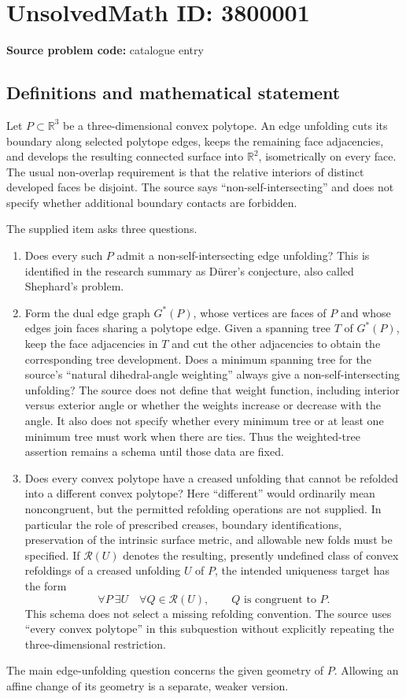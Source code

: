 \documentclass[11pt]{article}
\newcommand{\R}{\mathbb{R}}
\begin{document}
\section*{UnsolvedMath ID: 3800001}
\textbf{Source problem code:} catalogue entry
\subsection{Definitions and mathematical statement}
Let $P\subset\R^3$ be a three-dimensional convex polytope. An edge unfolding cuts its boundary along selected polytope edges, keeps the remaining face adjacencies, and develops the resulting connected surface into $\R^2$, isometrically on every face. The usual non-overlap requirement is that the relative interiors of distinct developed faces be disjoint. The source says ``non-self-intersecting'' and does not specify whether additional boundary contacts are forbidden.

The supplied item asks three questions.
\begin{enumerate}
\item Does every such $P$ admit a non-self-intersecting edge unfolding? This is identified in the research summary as Dürer's conjecture, also called Shephard's problem.
\item Form the dual edge graph $G^*(P)$, whose vertices are faces of $P$ and whose edges join faces sharing a polytope edge. Given a spanning tree $T$ of $G^*(P)$, keep the face adjacencies in $T$ and cut the other adjacencies to obtain the corresponding tree development. Does a minimum spanning tree for the source's ``natural dihedral-angle weighting'' always give a non-self-intersecting unfolding? The source does not define that weight function, including interior versus exterior angle or whether the weights increase or decrease with the angle. It also does not specify whether every minimum tree or at least one minimum tree must work when there are ties. Thus the weighted-tree assertion remains a schema until those data are fixed.
\item Does every convex polytope have a creased unfolding that cannot be refolded into a different convex polytope? Here ``different'' would ordinarily mean noncongruent, but the permitted refolding operations are not supplied. In particular the role of prescribed creases, boundary identifications, preservation of the intrinsic surface metric, and allowable new folds must be specified. If $\mathcal R(U)$ denotes the resulting, presently undefined class of convex refoldings of a creased unfolding $U$ of $P$, the intended uniqueness target has the form
\[
 \forall P\ \exists U\quad
 \forall Q\in\mathcal R(U),\qquad Q\text{ is congruent to }P.
\]
This schema does not select a missing refolding convention. The source uses ``every convex polytope'' in this subquestion without explicitly repeating the three-dimensional restriction.
\end{enumerate}
The main edge-unfolding question concerns the given geometry of $P$. Allowing an affine change of its geometry is a separate, weaker version.
\end{document}
